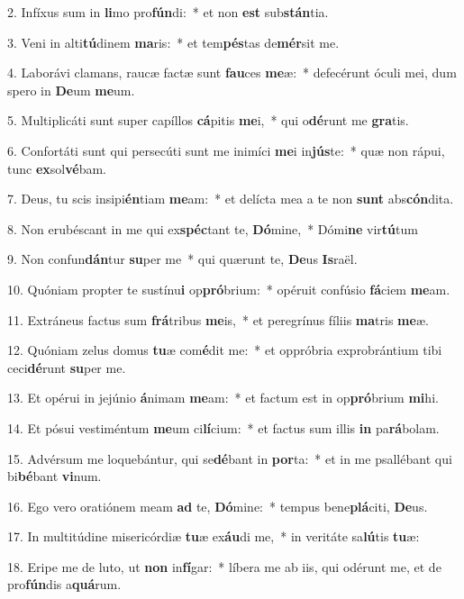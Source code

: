 2. Infíxus sum in \textbf{li}mo pro\textbf{fún}di:~*  et non \textbf{est} sub\textbf{stán}tia.\

3. Veni in alti\textbf{tú}dinem \textbf{ma}ris:~*  et tem\textbf{pés}tas de\textbf{mér}sit me.\

4. Laborávi clamans, raucæ factæ sunt \textbf{fau}ces \textbf{me}æ:~*  defecérunt óculi mei, dum spero in \textbf{De}um \textbf{me}um.\

5. Multiplicáti sunt super capíllos \textbf{cá}pitis \textbf{me}i,~*  qui o\textbf{dé}runt me \textbf{gra}tis.\

6. Confortáti sunt qui persecúti sunt me inimíci \textbf{me}i in\textbf{jús}te:~*  quæ non rápui, tunc \textbf{ex}sol\textbf{vé}bam.\

7. Deus, tu scis insipi\textbf{én}tiam \textbf{me}am:~*  et delícta mea a te non \textbf{sunt} abs\textbf{cón}dita.\

8. Non erubéscant in me qui ex\textbf{spéc}tant te, \textbf{Dó}mine,~*  Dómi\textbf{ne} vir\textbf{tú}tum\

9. Non confun\textbf{dán}tur \textbf{su}per me~*  qui quærunt te, \textbf{De}us \textbf{Is}raël.\

10. Quóniam propter te sustínu\textbf{i} op\textbf{pró}brium:~*  opéruit confúsio \textbf{fá}ciem \textbf{me}am.\

11. Extráneus factus sum \textbf{frá}tribus \textbf{me}is,~*  et peregrínus fíliis \textbf{ma}tris \textbf{me}æ.\

12. Quóniam zelus domus \textbf{tu}æ com\textbf{é}dit me:~*  et oppróbria exprobrántium tibi ceci\textbf{dé}runt \textbf{su}per me.\

13. Et opérui in jejúnio \textbf{á}nimam \textbf{me}am:~*  et factum est in op\textbf{pró}brium \textbf{mi}hi.\

14. Et pósui vestiméntum \textbf{me}um ci\textbf{lí}cium:~*  et factus sum illis \textbf{in} pa\textbf{rá}bolam.\

15. Advérsum me loquebántur, qui se\textbf{dé}bant in \textbf{por}ta:~*  et in me psallébant qui bi\textbf{bé}bant \textbf{vi}num.\

16. Ego vero oratiónem meam \textbf{ad} te, \textbf{Dó}mine:~*  tempus bene\textbf{plá}citi, \textbf{De}us.\

17. In multitúdine misericórdiæ \textbf{tu}æ ex\textbf{áu}di me,~*  in veritáte sa\textbf{lú}tis \textbf{tu}æ:\

18. Eripe me de luto, ut \textbf{non} in\textbf{fí}gar:~*  líbera me ab iis, qui odérunt me, et de pro\textbf{fún}dis a\textbf{quá}rum.\

